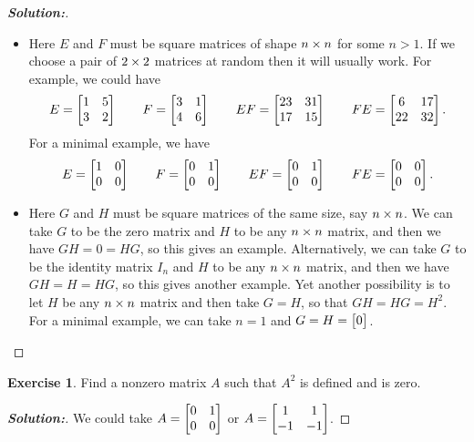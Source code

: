 \documentclass[a4paper]{amsart}
\theoremstyle{definition}
\newtheorem{exercise}{Exercise}
\newenvironment{solution}{\begin{proof}[\textbf{Solution:}] \vphantom{u}}{\end{proof}}
\begin{document}
\begin{solution}
\begin{itemize}
\[      D = \bbm 0 \\ 0 \ebm \qquad
      CD = \bbm 0 \ebm \qquad
      DC = \bbm 0 & 0 \\ 0 & 0 \ebm.
   \]
  \item[(c)] Here $E$ and $F$ must be square matrices of shape
   $n\times n$ for some $n>1$.  If we choose a pair of $2\times 2$ matrices
   at random then it will usually work.  For example, we could have 
   \[ E = \left[\begin{matrix} 1&5\\3&2 \end{matrix}\right] \qquad
      F = \left[\begin{matrix} 3&1\\4&6 \end{matrix}\right] \qquad
      EF = \left[\begin{matrix} 23 & 31 \\ 17 & 15 \end{matrix}\right] \qquad
      FE = \left[\begin{matrix} 6 & 17 \\ 22 & 32 \end{matrix}\right].
   \]
   For a minimal example, we have
   \[ E  = \left[\begin{matrix} 1&0\\0&0 \end{matrix}\right] \qquad
      F  = \left[\begin{matrix} 0&1\\0&0 \end{matrix}\right] \qquad
      EF = \left[\begin{matrix} 0&1\\0&0 \end{matrix}\right] \qquad
      FE = \left[\begin{matrix} 0&0\\0&0 \end{matrix}\right].
   \]
  \item[(d)] Here $G$ and $H$ must be square matrices of the same
   size, say $n\times n$.  We can take $G$ to be the zero matrix and $H$
   to be any $n\times n$ matrix, and then we have $GH=0=HG$, so this
   gives an example.  Alternatively, we can take $G$ to be the
   identity matrix $I_n$ and $H$ to be any $n\times n$ matrix, and then
   we have $GH=H=HG$, so this gives another example.  Yet another
   possibility is to let $H$ be any $n\times n$ matrix and then take
   $G=H$, so that $GH=HG=H^2$.  For a minimal example, we can take
   $n=1$ and $G=H=\left[\begin{matrix} 0 \end{matrix}\right]$.
 \end{itemize}
\end{solution}

\begin{exercise}\label{ex-mat-prod-eg-ii}
 Find a nonzero matrix $A$ such that $A^2$ is defined and is zero.
\end{exercise}
\begin{solution}
 We could take $A=\left[\begin{matrix} 0&1\\0&0\end{matrix}\right]$ or $A=\left[\begin{matrix} 1&1\\-1&-1\end{matrix}\right]$.
\end{solution}
\end{document}
